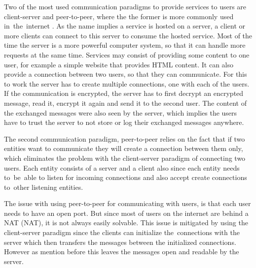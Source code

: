 Two of the most used communication paradigms to provide services to users are client-server and peer-to-peer, where the the former is more commonly used in~the~internet \cite{Forouzan2010}. As the name implies a service is hosted on a server, a client or more clients can connect to this server to consume the hosted service. Most of the time the server is a more powerful computer system, so that it can handle more requests at the same time. Services may consist of providing some content to one user, for example a simple website that provides HTML content. It can also provide a connection between two users, so that they can communicate. For this to work the server has to create multiple connections, one with each of the users. If the communication is encrypted, the server has to first decrypt an encrypted message, read it, encrypt it again and send it to the second user. The content of the exchanged messages were also seen by the server, which implies the users have to trust the server to not store or log their exchanged messages anywhere.

The second communication paradigm, peer-to-peer relies on the fact that if two entities want to communicate they will create a connection between them only, which eliminates the problem with the client-server paradigm of connecting two users. Each entity consists of a server and a client also since each entity needs to~be~able to listen for incoming connections and also accept create connections to~other listening entities.

The issue with using peer-to-peer for communicating with users, is that each user needs to have an open port. But since most of users on the internet are behind a NAT (\acl{NAT}), it is not always easily solvable. This issue is mitigated by using the client-server paradigm since the clients can initialize the~connections with the server which then transfers the messages between the initialized connections. However as mention before this leaves the messages open and readable by the server. 
